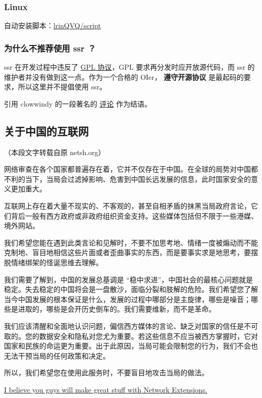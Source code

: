 \subsubsection{Linux}

自动安装脚本：\href{https://github.com/lrinQVQ/script}{lrinQVQ/script}

\subsubsection{为什么不推荐使用 ssr ？}

ssr 在开发过程中违反了 \href{https://zh.wikipedia.org/wiki/GNU\%E9%80%9A%E7%94%A8%E5%85%AC%E5%85%B1%E8%AE%B8%E5%8F%AF%E8%AF%81}{GPL 协议}，GPL 要求再分发时应开放源代码，而 ssr 的维护者并没有做到这一点。作为一个合格的 OIer， \textbf{遵守开源协议} 是最起码的要求，所以这里并不提倡使用 ssr。

引用 clowwindy 的一段著名的 \href{https://github.com/shadowsocks/shadowsocks-windows/issues/293#issuecomment-132253168}{评论} 作为结语。

\subsection{关于中国的互联网}

（本段文字转载自原 netsh.org）

网络审查在各个国家都普遍存在着，它并不仅存在于中国。在全球的局势对中国都不利的当下，当局会过滤掉影响、危害到中国长远发展的信息，此时国家安全的意义更加重大。

互联网上存在着大量不现实的、不客观的，甚至自相矛盾的抹黑当局政府言论，它们背后一般有西方政府或非政府组织资金支持。这些媒体包括但不限于一些港媒、境外网站。

我们希望您能在遇到此类言论和见解时，不要不加思考地、情绪一度被煽动而不能克制地、盲目地相信这些片面或者歪曲事实的东西，而是要事实求是地思考，要摆脱情绪绑架的怪诞思维去理解。

我们需要了解到，中国的发展总基调是 “稳中求进”，中国社会的最核心问题就是稳定。失去稳定的中国将会是一盘散沙，面临分裂和肢解的危险。我们希望您了解当今中国发展的根本保证是什么，发展的过程中哪部分是主旋律，哪些是噪音；哪些是进取的，哪些是会开历史倒车的。我们需要维新，而不是革命。

我们应该清醒和全面地认识问题，偏信西方媒体的言论、缺乏对国家的信任是不可取的。您的数据安全和隐私对您尤为重要。若这些信息不应当被西方掌握时，它对国家和民族的命运更为重要。出于此原因，当局可能会限制您的行为，我们不会也无法干预当局的任何政策和决定。

所以，我们希望您在使用此服务时，不要盲目地攻击当局的做法。

\hr

\begin{QUOTE}{}{}
\href{https://github.com/shadowsocks/shadowsocks-iOS/issues/124#issuecomment-133630294}{I believe you guys will make great stuff with Network Extensions.}
\end{QUOTE}
